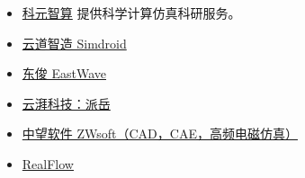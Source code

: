 
\begin{itemize}
\item \href{https://www.keyuanzhisuan.com/}{科元智算} 提供科学计算仿真科研服务。
\item \href{https://www.ibe.cn/}{云道智造 Simdroid}
\item \href{https://www.eastfdtd.com/index.aspx}{东俊 EastWave}
\item \href{https://www.yunpaikeji.com.cn/cpfw}{云湃科技：派岳}
\item \href{https://www.zwsoft.cn/product/cae/waves}{中望软件 ZWsoft（CAD，CAE，高频电磁仿真）}
\item \href{https://www.realflow.com.cn/}{RealFlow}
\end{itemize}

